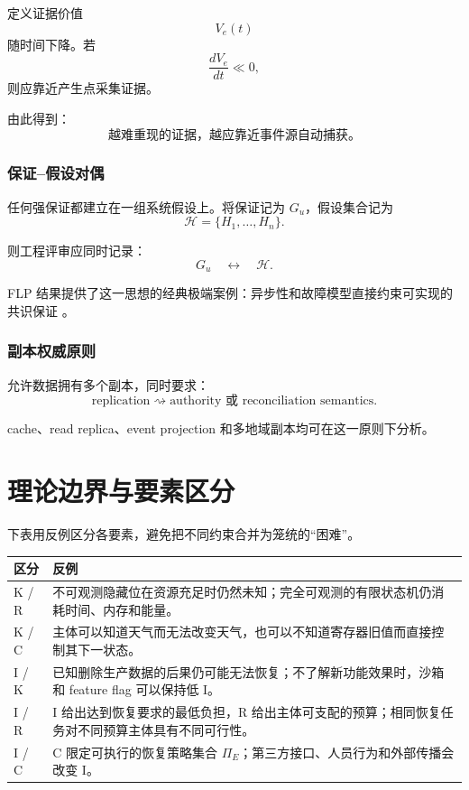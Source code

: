 \documentclass[11pt,a4paper]{ctexart}
\numberwithin{equation}{section}
\theoremstyle{definition}
\theoremstyle{plain}
\begin{document}
定义证据价值
\[
V_e(t)
\]
随时间下降。若
\[
\frac{dV_e}{dt}\ll 0,
\]
则应靠近产生点采集证据。

由此得到：
\[
\boxed{
\text{越难重现的证据，越应靠近事件源自动捕获。}
}
\]

\subsubsection{保证--假设对偶}

任何强保证都建立在一组系统假设上。将保证记为 $G_u$，假设集合记为
\[
\mathcal{H}=\{H_1,\ldots,H_n\}.
\]

则工程评审应同时记录：
\[
\boxed{
G_u\quad\leftrightarrow\quad\mathcal{H}.
}
\]

FLP 结果提供了这一思想的经典极端案例：异步性和故障模型直接约束可实现的共识保证 \cite{flp1985}。

\subsubsection{副本权威原则}

允许数据拥有多个副本，同时要求：
\[
\boxed{
\text{replication}
\rightsquigarrow
\text{authority 或 reconciliation semantics}.
}
\]

cache、read replica、event projection 和多地域副本均可在这一原则下分析。

\section{理论边界与要素区分}
\label{sec:independence}

下表用反例区分各要素，避免把不同约束合并为笼统的“困难”。

\begin{center}
\begin{tabularx}{\textwidth}{>{\raggedright\arraybackslash}p{}X}
\toprule
\textbf{区分} & \textbf{反例}\\
\midrule
K / R & 不可观测隐藏位在资源充足时仍然未知；完全可观测的有限状态机仍消耗时间、内存和能量。\\
K / C & 主体可以知道天气而无法改变天气，也可以不知道寄存器旧值而直接控制其下一状态。\\

I / K & 已知删除生产数据的后果仍可能无法恢复；不了解新功能效果时，沙箱和 feature flag 可以保持低 I。\\
I / R & I 给出达到恢复要求的最低负担，R 给出主体可支配的预算；相同恢复任务对不同预算主体具有不同可行性。\\
I / C & C 限定可执行的恢复策略集合 $\Pi_E$；第三方接口、人员行为和外部传播会改变 I。\\
\bottomrule
\end{tabularx}
\end{center}
\end{document}

